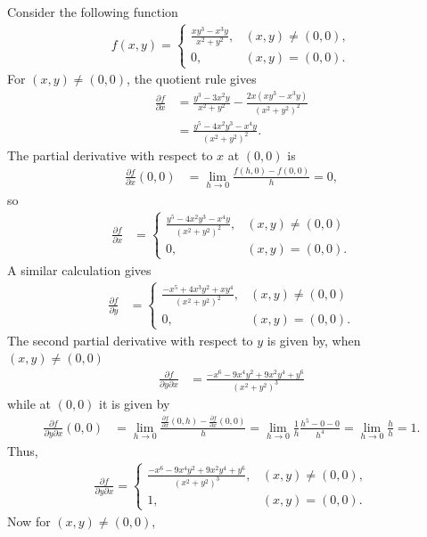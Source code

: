 \documentclass[12pt,letterpaper,reqno]{article}
\numberwithin{equation}{section}
\begin{document}
{\begin{example}
Consider the following function
\begin{align*}
	f(x,y)=\begin{cases}
		\frac{xy^3-x^3y}{x^2+y^2}, &(x,y)\neq (0,0), \\
		0, &(x,y)=(0,0).
	\end{cases}
\end{align*}
For $(x,y) \neq (0,0)$, the quotient rule gives
\begin{align*}
\frac{\partial f}{\partial x}&=\frac{y^3-3x^2y}{x^2+y^2}-\frac{2x(xy^3-x^3y)}{(x^2+y^2)^2} \\
&=\frac{y^5-4x^2y^3-x^4y}{(x^2+y^2)^2}.
\end{align*}
The partial derivative with respect to $x$ at $(0,0)$ is 
\begin{align*}
	\frac{\partial f}{\partial x}(0,0)&=\lim_{h \to 0}\frac{f(h,0)-f(0,0)}{h}=0,
\end{align*}	
so 
\begin{align*}
	\frac{\partial f}{\partial x}&=
	\begin{cases}
	\frac{y^5-4x^2y^3-x^4y}{(x^2+y^2)^2}, &(x,y)\neq (0,0) \\
		0, &(x,y)=(0,0).
	\end{cases}
\end{align*}
A similar calculation gives
\begin{align*}
	\frac{\partial f}{\partial y}&=\begin{cases}
		\frac{-x^5+4x^3y^2+xy^4}{(x^2+y^2)^2}, &(x,y)\neq (0,0) \\
		0, &(x,y)=(0,0).
	\end{cases}
\end{align*}
The second partial derivative with respect to $y$ is given by, when $(x,y) \neq (0,0)$
\begin{align*}
	\frac{\partial f}{\partial y \partial x}&=\frac{-x^6-9x^4y^2+9x^2y^4+y^6}{(x^2+y^2)^3}
\end{align*}
while at $(0,0)$ it is given by
\begin{align*}
	\frac{\partial f}{\partial y \partial x}(0,0)&=\lim_{h \to 0}\frac{\frac{\partial f}{\partial x}(0,h)-\frac{\partial f}{\partial x}(0,0)}{h}=\lim_{h \to 0}\frac{1}{h}\frac{h^5-0-0}{h^4}=\lim_{h \to 0}\frac{h}{h}=1.
\end{align*}
Thus,
\begin{align*}
	\frac{\partial f}{\partial y \partial x}=\begin{cases}
		\frac{-x^6-9x^4y^2+9x^2y^4+y^6}{(x^2+y^2)^3}, &(x,y) \neq (0,0), \\
		1, &(x,y)=(0,0).
	\end{cases}
\end{align*}
Now for $(x,y) \neq (0,0)$,


\end{example}}
\end{document}
